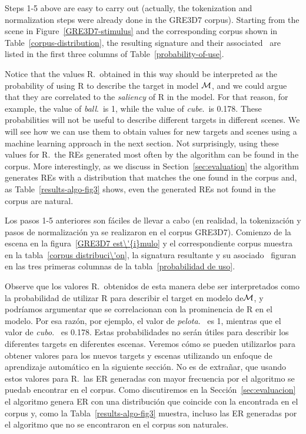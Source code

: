 Steps 1-5 above are easy to carry out (actually, the tokenization and
normalization steps were already done in the GRE3D7 corpus).  Starting
from the scene in Figure~\ref{GRE3D7-stimulus} and the corresponding
corpus shown in Table~\ref{corpus-distribution}, the resulting
signature and their associated \puse\ are listed in the first three
columns of Table~\ref{probability-of-use}.

Notice that the values R.\puse\ obtained in this way should be
interpreted as the probability of using R to describe the target in
model $\mathcal{M}$, and we could argue that they are correlated to the
\emph{saliency} of R in the model.  For that reason, for example, the
value of \emph{ball}.\puse\ is 1, while the value of
\emph{cube}.\puse\ is 0.178.  These probabilities will not be useful
to describe different targets in different scenes.  We will see how we
can use them to obtain values for new targets and scenes using a
machine learning approach in the next section.  Not surprisingly,
using these values for R.\puse\ the REs generated most often by the
algorithm can be found in the corpus.  More interestingly, as we
discuss in Section~\ref{sec:evaluation} the algorithm generates REs
with a distribution that matches the one found in the corpus and, as
Table~\ref{results-algo-fig3} shows, even the generated REs not found
in the corpus are natural.

Los pasos 1-5 anteriores son f\'aciles de llevar a cabo (en realidad, la tokenizaci\'on y
pasos de normalizaci\'on ya se realizaron en el corpus GRE3D7). Comienzo
de la escena en la figura~\ref{GRE3D7 est\'{i}mulo} y el correspondiente
corpus muestra en la tabla~\ref{corpus distribuci\'on}, la signatura resultante
y su asociado \puse\ figuran en las tres primeras
columnas de la tabla~\ref{probabilidad de uso}.

Observe que los valores R.\puse\ obtenidos de esta manera debe ser
interpretados como la probabilidad de utilizar R para describir el target en
modelo de$\mathcal{M} $, y podr\'{i}amos argumentar que se correlacionan con la
 prominencia de R en el modelo. Por esa raz\'on, por ejemplo, el
valor de \emph{pelota}. \puse\ es 1, mientras que el valor de
\emph{cubo}. \puse\ es 0.178. Estas probabilidades no ser\'an \'utiles
para describir los diferentes targets en diferentes escenas. Veremos c\'omo se
pueden utilizarlos para obtener valores para los nuevos targets y escenas utilizando un
enfoque de aprendizaje autom\'atico en la siguiente secci\'on. No es de extra\~nar,
que usando estos valores para R.\puse\ las ER generadas con mayor frecuencia por el
algoritmo se puedab encontrar en el corpus. Como discutiremos en la Secci\'on~\ref{sec:evaluacion} el algoritmo genera ER
con una distribuci\'on que coincide con la encontrada en el corpus y, como la
Tabla~\ref{results-algo-fig3} muestra, incluso las ER generadas por el algoritmo que no se encontraron
en el corpus son naturales.


